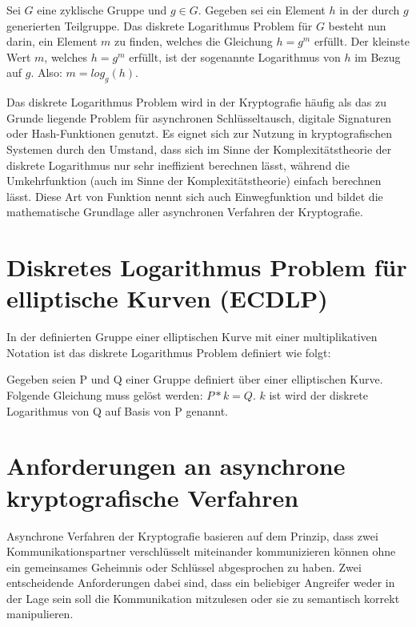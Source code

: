 Sei $ G $ eine zyklische Gruppe und $ g \in G $. Gegeben sei ein Element $h$ in der durch $g$ generierten Teilgruppe.
Das diskrete Logarithmus Problem für $G$ besteht nun darin, ein Element $m$ zu finden, welches die Gleichung $ h = g^m $ erfüllt.
Der kleinste Wert $m$, welches $h = g^m$ erfüllt, ist der sogenannte Logarithmus von $h$ im Bezug auf $g$. Also: $m = log_g(h)$.

Das diskrete Logarithmus Problem wird in der Kryptografie häufig als das zu Grunde liegende Problem für asynchronen Schlüsseltausch, digitale Signaturen oder Hash-Funktionen genutzt. Es eignet sich zur Nutzung in kryptografischen
Systemen durch den Umstand, dass sich im Sinne der Komplexitätstheorie der diskrete Logarithmus nur sehr ineffizient
berechnen lässt, während die Umkehrfunktion (auch im Sinne der Komplexitätstheorie) einfach berechnen lässt.
Diese Art von Funktion nennt sich auch Einwegfunktion und bildet die mathematische Grundlage aller asynchronen 
Verfahren der Kryptografie.	

\section{Diskretes Logarithmus Problem für elliptische Kurven (ECDLP)}
In der definierten Gruppe einer elliptischen Kurve mit einer multiplikativen Notation
ist das diskrete Logarithmus Problem definiert wie folgt:

Gegeben seien P und Q einer Gruppe definiert über einer elliptischen Kurve.
Folgende Gleichung muss gelöst werden: $ P*k = Q $. $k$ ist wird der diskrete Logarithmus von Q
auf Basis von P genannt.


\section{Anforderungen an asynchrone kryptografische Verfahren}

Asynchrone Verfahren der Kryptografie basieren auf dem Prinzip, dass zwei Kommunikationspartner verschlüsselt miteinander kommunizieren können ohne ein gemeinsames Geheimnis oder Schlüssel abgesprochen zu haben. Zwei entscheidende Anforderungen dabei sind, dass ein beliebiger Angreifer weder in der Lage sein soll die Kommunikation mitzulesen oder sie zu semantisch korrekt manipulieren.


